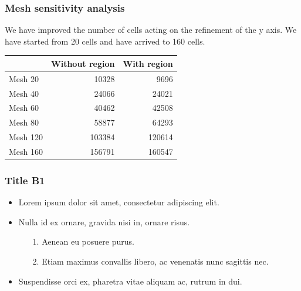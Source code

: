 \documentclass{beamer}
\begin{document}
\begin{frame}
\frametitle{Mesh sensitivity analysis}

We have improved the number of cells acting on the refinement of the y axis.
We have started from 20 cells and have arrived to 160 cells.
\begin{table}[H]
\centering
\begin{tabular}{lrr}
\toprule
         & Without region & With region \\ \midrule
Mesh 20  & 10328          & 9696        \\
Mesh 40  & 24066          & 24021       \\
Mesh 60  & 40462          & 42508       \\
Mesh 80  & 58877          & 64293       \\
Mesh 120 & 103384         & 120614      \\
Mesh 160 & 156791         & 160547      \\ \bottomrule
\end{tabular}
\end{table}

\end{frame}




























\begin{frame}
\frametitle{Title B1}
\begin{itemize}
\addtolength{\itemsep}{.2cm}
\item Lorem ipsum dolor sit amet, consectetur adipiscing elit.
\item Nulla id ex ornare, gravida nisi in, ornare risus.
  \begin{itemize}
    \addtolength{\itemsep}{.1cm}
  \item[1.] Aenean eu posuere purus.
  \item[2.] Etiam maximus convallis libero, ac venenatis nunc sagittis nec.
  \end{itemize}
\item Suspendisse orci ex, pharetra vitae aliquam ac, rutrum in dui.
\end{itemize}

\end{frame}
\end{document}
